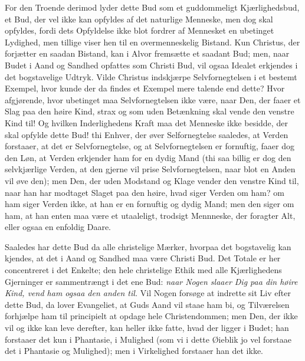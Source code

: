\documentclass[12pt,a4paper]{book}
\newcommand{\opage}[1]{\marginnote{\footnotesize\textit{[#1]}}}
\begin{document}
For den Troende derimod lyder dette Bud som et guddommeligt Kjærlighedsbud,
et Bud, der vel ikke kan opfyldes af det naturlige Menneske, men dog skal
opfyldes, fordi dets Opfyldelse ikke blot fordrer af Mennesket en ubetinget
Lydighed, men tillige viser hen til en overmenneskelig Bistand. Kun Christus,
der forjætter en saadan Bistand, kan i Alvor fremsætte et saadant Bud; men,
naar Budet i Aand og Sandhed opfattes som Christi Bud, vil ogsaa Idealet
erkjendes i det bogstavelige Udtryk. Vilde Christus indskjærpe
Selvfornegtelsen i et bestemt Exempel, hvor kunde der da findes et Exempel
mere talende end dette? Hvor afgjørende, hvor ubetinget maa Selvfornegtelsen
ikke være, naar Den, der faaer et Slag paa den høire Kind, strax og som uden
Betænkning skal vende den venstre Kind til! Og hvilken
\opage{73} Inderlighedens Kraft maa det Menneske ikke besidde, der skal opfylde dette
Bud! thi Enhver, der øver Selfornegtelse saaledes, at Verden forstaaer, at
det er Selvfornegtelse, og at Selvfornegtelsen er fornuftig, faaer dog den
Løn, at Verden erkjender ham for en dydig Mand (thi saa billig er dog den
selvkjærlige Verden, at den gjerne vil prise Selvfornegtelsen, naar blot en
Anden vil øve den); men Den, der uden Modstand og Klage vender den venstre
Kind til, naar han har modtaget Slaget paa den høire, hvad siger Verden om
ham? om ham siger Verden ikke, at han er en fornuftig og dydig Mand; men den
siger om ham, at han enten maa være et utaaleligt, trodsigt
Mennneske, der foragter Alt, eller ogsaa en enfoldig Daare.

Saaledes har dette Bud da alle christelige Mærker, hvorpaa det bogstavelig
kan kjendes, at det i Aand og Sandhed maa være Christi Bud. Det Totale er her
concentreret i det Enkelte; den hele christelige Ethik med alle Kjærlighedens
Gjerninger er sammentrængt i det ene Bud: \emph{naar Nogen slaaer Dig paa din
høire Kind, vend ham ogsaa den anden til.} Vil Nogen forsøge at indrette sit
Liv efter dette Bud, da lover Evangeliet, at Guds Aand vil staae ham bi, og
Tilværelsen forhjælpe ham til principielt at opdage hele Christendommen; men
Den, der ikke vil og ikke kan leve derefter, kan heller ikke fatte, hvad der
ligger i Budet; han forstaaer det kun i Phantasie, i Mulighed (som vi i dette
Øieblik jo vel forstaae det i Phantasie og Mulighed); men i Virkelighed
forstaaer han det ikke.
\end{document}
